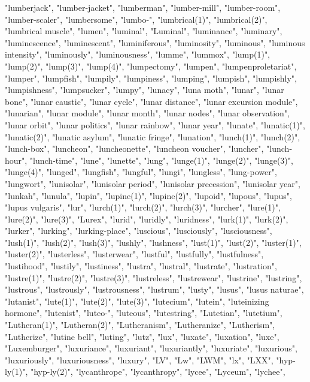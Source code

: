 "lumberjack",
"lumber-jacket",
"lumberman",
"lumber-mill",
"lumber-room",
"lumber-scaler",
"lumbersome",
"lumbo-",
"lumbrical(1)",
"lumbrical(2)",
"lumbrical muscle",
"lumen",
"luminal",
"Luminal",
"luminance",
"luminary",
"luminescence",
"luminescent",
"luminiferous",
"luminosity",
"luminous",
"luminous intensity",
"luminously",
"luminousness",
"lumme",
"lummox",
"lump(1)",
"lump(2)",
"lump(3)",
"lump(4)",
"lumpectomy",
"lumpen",
"lumpenproletariat",
"lumper",
"lumpfish",
"lumpily",
"lumpiness",
"lumping",
"lumpish",
"lumpishly",
"lumpishness",
"lumpsucker",
"lumpy",
"lunacy",
"luna moth",
"lunar",
"lunar bone",
"lunar caustic",
"lunar cycle",
"lunar distance",
"lunar excursion module",
"lunarian",
"lunar module",
"lunar month",
"lunar nodes",
"lunar observation",
"lunar orbit",
"lunar politics",
"lunar rainbow",
"lunar year",
"lunate",
"lunatic(1)",
"lunatic(2)",
"lunatic asylum",
"lunatic fringe",
"lunation",
"lunch(1)",
"lunch(2)",
"lunch-box",
"luncheon",
"luncheonette",
"luncheon voucher",
"luncher",
"lunch-hour",
"lunch-time",
"lune",
"lunette",
"lung",
"lunge(1)",
"lunge(2)",
"lunge(3)",
"lunge(4)",
"lunged",
"lungfish",
"lungful",
"lungi",
"lungless",
"lung-power",
"lungwort",
"lunisolar",
"lunisolar period",
"lunisolar precession",
"lunisolar year",
"lunkah",
"lunula",
"lupin",
"lupine(1)",
"lupine(2)",
"lupoid",
"lupous",
"lupus",
"lupus vulgaris",
"lur",
"lurch(1)",
"lurch(2)",
"lurch(3)",
"lurcher",
"lure(1)",
"lure(2)",
"lure(3)",
"Lurex",
"lurid",
"luridly",
"luridness",
"lurk(1)",
"lurk(2)",
"lurker",
"lurking",
"lurking-place",
"luscious",
"lusciously",
"lusciousness",
"lush(1)",
"lush(2)",
"lush(3)",
"lushly",
"lushness",
"lust(1)",
"lust(2)",
"luster(1)",
"luster(2)",
"lusterless",
"lusterwear",
"lustful",
"lustfully",
"lustfulness",
"lustihood",
"lustily",
"lustiness",
"lustra",
"lustral",
"lustrate",
"lustration",
"lustre(1)",
"lustre(2)",
"lustre(3)",
"lustreless",
"lustrewear",
"lustrine",
"lustring",
"lustrous",
"lustrously",
"lustrousness",
"lustrum",
"lusty",
"lusus",
"lusus naturae",
"lutanist",
"lute(1)",
"lute(2)",
"lute(3)",
"lutecium",
"lutein",
"luteinizing hormone",
"lutenist",
"luteo-",
"luteous",
"lutestring",
"Lutetian",
"lutetium",
"Lutheran(1)",
"Lutheran(2)",
"Lutheranism",
"Lutheranize",
"Lutherism",
"Lutherize",
"lutine bell",
"luting",
"lutz",
"lux",
"luxate",
"luxation",
"luxe",
"Luxemburger",
"luxuriance",
"luxuriant",
"luxuriantly",
"luxuriate",
"luxurious",
"luxuriously",
"luxuriousness",
"luxury",
"LV",
"Lw",
"LWM",
"lx",
"LXX",
"hyp-ly(1)",
"hyp-ly(2)",
"lycanthrope",
"lycanthropy",
"lycee",
"Lyceum",
"lychee",
